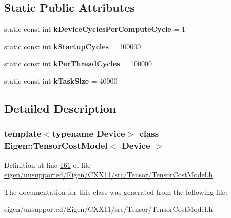 \subsection*{Static Public Attributes}
\begin{DoxyCompactItemize}
\item 
\mbox{\label{class_eigen_1_1_tensor_cost_model_aacc1ccad600d995d73f8945f8f227ec3}} 
static const int {\bfseries k\+Device\+Cycles\+Per\+Compute\+Cycle} = 1
\item 
\mbox{\label{class_eigen_1_1_tensor_cost_model_a736e7589eb5b14653e45e38e3d3b973e}} 
static const int {\bfseries k\+Startup\+Cycles} = 100000
\item 
\mbox{\label{class_eigen_1_1_tensor_cost_model_a489d89d33cb37949a62757765602057e}} 
static const int {\bfseries k\+Per\+Thread\+Cycles} = 100000
\item 
\mbox{\label{class_eigen_1_1_tensor_cost_model_a649d4fa3e76d7caa020d1ad7e0431b37}} 
static const int {\bfseries k\+Task\+Size} = 40000
\end{DoxyCompactItemize}


\subsection{Detailed Description}
\subsubsection*{template$<$typename Device$>$\newline
class Eigen\+::\+Tensor\+Cost\+Model$<$ Device $>$}



Definition at line \hyperlink{eigen_2unsupported_2_eigen_2_c_x_x11_2src_2_tensor_2_tensor_cost_model_8h_source_l00161}{161} of file \hyperlink{eigen_2unsupported_2_eigen_2_c_x_x11_2src_2_tensor_2_tensor_cost_model_8h_source}{eigen/unsupported/\+Eigen/\+C\+X\+X11/src/\+Tensor/\+Tensor\+Cost\+Model.\+h}.



The documentation for this class was generated from the following file\+:\begin{DoxyCompactItemize}
\item 
eigen/unsupported/\+Eigen/\+C\+X\+X11/src/\+Tensor/\+Tensor\+Cost\+Model.\+h\end{DoxyCompactItemize}
